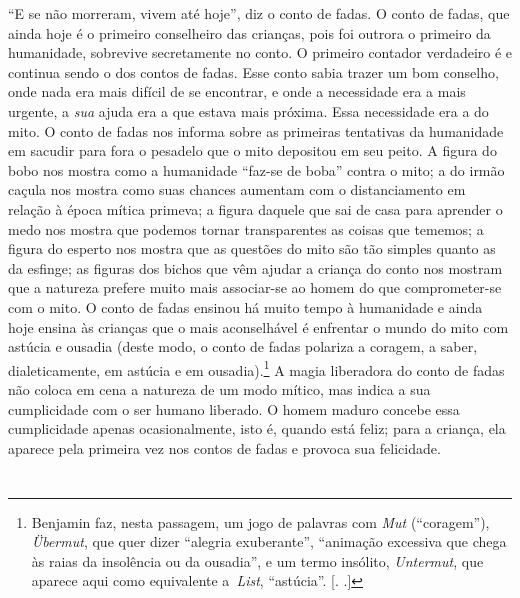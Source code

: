 ``E se não morreram, vivem até hoje'', diz o conto de fadas. O conto de
fadas, que ainda hoje é o primeiro conselheiro das crianças, pois foi
outrora o primeiro da humanidade, sobrevive secretamente no conto. O
primeiro contador verdadeiro é e continua sendo o dos contos de fadas.
Esse conto sabia trazer um bom conselho, onde nada era mais difícil de
se encontrar, e onde a necessidade era a mais urgente, a \emph{sua}
ajuda era a que estava mais próxima. Essa necessidade era a do mito. O
conto de fadas nos informa sobre as primeiras tentativas da humanidade
em sacudir para fora o pesadelo que o mito depositou em seu peito. A
figura do bobo nos mostra como a humanidade ``faz-se de boba'' contra o
mito; a do irmão caçula nos mostra como suas chances aumentam com o
distanciamento em relação à época mítica primeva; a figura daquele que
sai de casa para aprender o medo nos mostra que podemos tornar
transparentes as coisas que tememos; a figura do esperto nos mostra que
as questões do mito são tão simples quanto as da esfinge; as figuras dos
bichos que vêm ajudar a criança do conto nos mostram que a natureza
prefere muito mais associar-se ao homem do que comprometer-se com o
mito. O conto de fadas ensinou há muito tempo à humanidade e ainda hoje
ensina às crianças que o mais aconselhável é enfrentar o mundo do mito
com astúcia e ousadia (deste modo, o conto de fadas polariza a coragem,
a saber, dialeticamente, em astúcia e em ousadia).\footnote{Benjamin faz,
  nesta passagem, um jogo de palavras com \emph{Mut} (``coragem''),
  \emph{Übermut}, que quer dizer ``alegria exuberante'', ``animação
  excessiva que chega às raias da insolência ou da ousadia'', e um termo
  insólito, \emph{Untermut}, que aparece aqui como equivalente
  a~\emph{List}, ``astúcia''. [. .]} A magia liberadora do
conto de fadas não coloca em cena a natureza de um modo mítico, mas
indica a sua cumplicidade com o ser humano liberado\label{supra5}. O homem maduro
concebe essa cumplicidade apenas ocasionalmente, isto é, quando está
feliz; para a criança, ela aparece pela primeira vez nos contos de fadas
e provoca sua felicidade.

\section{}

